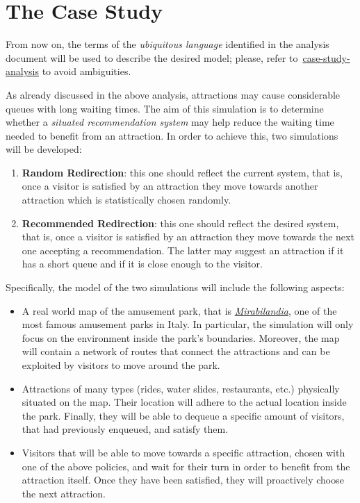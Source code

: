 \section{The Case Study}\label{sec:the-case-study}

From now on, the terms of the \textit{ubiquitous language} identified in the analysis document will be used to describe the desired model;
please, refer to~\href{https://github.com/ICPS-MicroCity/case-study-analysis/releases/tag/v0.2.1}{case-study-analysis} to avoid ambiguities.

As already discussed in the above analysis, attractions may cause considerable queues with long waiting times.
The aim of this simulation is to determine whether a \textit{situated recommendation system} may help reduce the waiting time needed to benefit from an attraction.
In order to achieve this, two simulations will be developed:
\begin{enumerate}
    \item \textbf{Random Redirection}: this one should reflect the current system, that is, once a visitor is satisfied by an attraction they move towards another attraction which is statistically chosen randomly.
    \item \textbf{Recommended Redirection}: this one should reflect the desired system, that is, once a visitor is satisfied by an attraction they move towards the next one accepting a recommendation.
    The latter may suggest an attraction if it has a short queue and if it is close enough to the visitor.
\end{enumerate}
%
Specifically, the model of the two simulations will include the following aspects:
\begin{itemize}
    \item A real world map of the amusement park, that is \href{https://www.mirabilandia.it/}{\textit{Mirabilandia}}, one of the most famous amusement parks in Italy.
    In particular, the simulation will only focus on the environment inside the park's boundaries.
    Moreover, the map will contain a network of routes that connect the attractions and can be exploited by visitors to move around the park.
    \item Attractions of many types (rides, water slides, restaurants, etc.) physically situated on the map.
    Their location will adhere to the actual location inside the park.
    Finally, they will be able to dequeue a specific amount of visitors, that had previously enqueued, and satisfy them.
    \item Visitors that will be able to move towards a specific attraction, chosen with one of the above policies, and wait for their turn in order to benefit from the attraction itself.
    Once they have been satisfied, they will proactively choose the next attraction.
\end{itemize}
